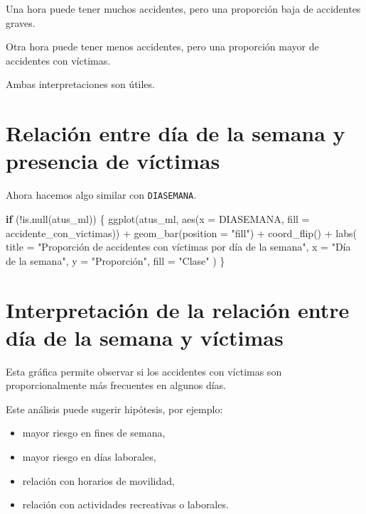 \documentclass[
  11pt,
  letterpaper,
]{book}
\newenvironment{Shaded}{\begin{snugshade}}{\end{snugshade}}
\newcommand{\AttributeTok}[1]{\textcolor[rgb]{0.40,0.45,0.13}{#1}}
\newcommand{\ControlFlowTok}[1]{\textcolor[rgb]{0.00,0.23,0.31}{\textbf{#1}}}
\newcommand{\FunctionTok}[1]{\textcolor[rgb]{0.28,0.35,0.67}{#1}}
\newcommand{\NormalTok}[1]{\textcolor[rgb]{0.00,0.23,0.31}{#1}}
\newcommand{\SpecialCharTok}[1]{\textcolor[rgb]{0.37,0.37,0.37}{#1}}
\newcommand{\StringTok}[1]{\textcolor[rgb]{0.13,0.47,0.30}{#1}}
\providecommand{\tightlist}{%
  \setlength{\itemsep}{0pt}\setlength{\parskip}{0pt}}
\begin{document}
Una hora puede tener muchos accidentes, pero una proporción baja de
accidentes graves.

Otra hora puede tener menos accidentes, pero una proporción mayor de
accidentes con víctimas.

Ambas interpretaciones son útiles.

\section{Relación entre día de la semana y presencia de
víctimas}\label{relaciuxf3n-entre-duxeda-de-la-semana-y-presencia-de-vuxedctimas}

Ahora hacemos algo similar con \texttt{DIASEMANA}.

\begin{Shaded}
\begin{Highlighting}[]
\ControlFlowTok{if}\NormalTok{ (}\SpecialCharTok{!}\FunctionTok{is.null}\NormalTok{(atus\_ml)) \{}
  \FunctionTok{ggplot}\NormalTok{(atus\_ml, }\FunctionTok{aes}\NormalTok{(}\AttributeTok{x =}\NormalTok{ DIASEMANA, }\AttributeTok{fill =}\NormalTok{ accidente\_con\_victimas)) }\SpecialCharTok{+}
    \FunctionTok{geom\_bar}\NormalTok{(}\AttributeTok{position =} \StringTok{"fill"}\NormalTok{) }\SpecialCharTok{+}
    \FunctionTok{coord\_flip}\NormalTok{() }\SpecialCharTok{+}
    \FunctionTok{labs}\NormalTok{(}
      \AttributeTok{title =} \StringTok{"Proporción de accidentes con víctimas por día de la semana"}\NormalTok{,}
      \AttributeTok{x =} \StringTok{"Día de la semana"}\NormalTok{,}
      \AttributeTok{y =} \StringTok{"Proporción"}\NormalTok{,}
      \AttributeTok{fill =} \StringTok{"Clase"}
\NormalTok{    )}
\NormalTok{\}}
\end{Highlighting}
\end{Shaded}

\section{Interpretación de la relación entre día de la semana y
víctimas}\label{interpretaciuxf3n-de-la-relaciuxf3n-entre-duxeda-de-la-semana-y-vuxedctimas}

Esta gráfica permite observar si los accidentes con víctimas son
proporcionalmente más frecuentes en algunos días.

Este análisis puede sugerir hipótesis, por ejemplo:

\begin{itemize}
\tightlist
\item
  mayor riesgo en fines de semana,
\item
  mayor riesgo en días laborales,
\item
  relación con horarios de movilidad,
\item
  relación con actividades recreativas o laborales.
\end{itemize}
\end{document}
